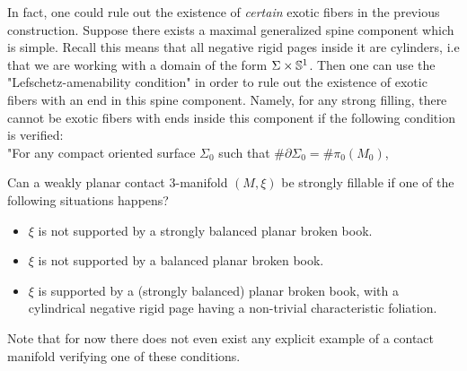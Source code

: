 \documentclass[../main.tex]{subfiles}
\begin{document}
\begin{remark}
In fact, one could rule out the existence of \textit{certain} exotic fibers in the previous construction. Suppose there exists a maximal generalized spine component which is simple. Recall this means that all negative rigid pages inside it are cylinders, i.e that we are working with a domain of the form $\Sigma\times \mathbb{S}^1$. Then one can use the "Lefschetz-amenability condition" in order to rule out the existence of exotic fibers with an end in this spine component. Namely, for any strong filling, there cannot be exotic fibers with ends inside this component if the following condition is verified:\\
"For any compact oriented surface $\Sigma_0$ such that $\#\partial\Sigma_0 = \#\pi_0(M_0)$, 
\end{remark}

\begin{question}
Can a weakly planar contact 3-manifold $(M,\xi)$ be strongly fillable if one of the following situations happens?
\begin{itemize}
    \item $\xi$ is not supported by a strongly balanced planar broken book. 
    \item $\xi$ is not supported by a balanced planar broken book.
    \item $\xi$ is supported by a (strongly balanced) planar broken book, with a cylindrical negative rigid page having a non-trivial characteristic foliation.
\end{itemize}
Note that for now there does not even exist any explicit example of a contact manifold verifying one of these conditions.
\end{question}
\end{document}
